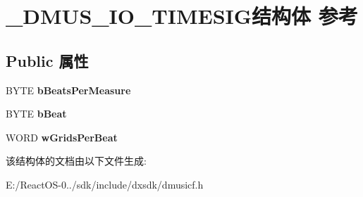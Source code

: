 \hypertarget{struct___d_m_u_s___i_o___t_i_m_e_s_i_g}{}\section{\+\_\+\+D\+M\+U\+S\+\_\+\+I\+O\+\_\+\+T\+I\+M\+E\+S\+I\+G结构体 参考}
\label{struct___d_m_u_s___i_o___t_i_m_e_s_i_g}
\subsection*{Public 属性}
\begin{DoxyCompactItemize}
\item 
\mbox{\label{struct___d_m_u_s___i_o___t_i_m_e_s_i_g_a3a309c4f66da75d10892a41b5cdbffaf}} 
B\+Y\+TE {\bfseries b\+Beats\+Per\+Measure}
\item 
\mbox{\label{struct___d_m_u_s___i_o___t_i_m_e_s_i_g_aa3001f60606e1e0f438923110ebfea7e}} 
B\+Y\+TE {\bfseries b\+Beat}
\item 
\mbox{\label{struct___d_m_u_s___i_o___t_i_m_e_s_i_g_a13b09bae4a09ce472f6f78b10eb4fbf1}} 
W\+O\+RD {\bfseries w\+Grids\+Per\+Beat}
\end{DoxyCompactItemize}


该结构体的文档由以下文件生成\+:\begin{DoxyCompactItemize}
\item 
E\+:/\+React\+O\+S-\/0../sdk/include/dxsdk/dmusicf.\+h\end{DoxyCompactItemize}
